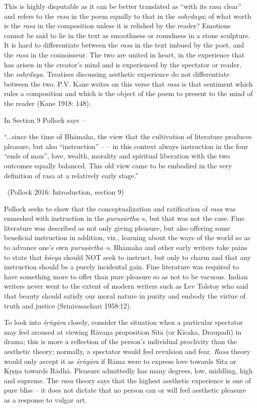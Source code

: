 This is highly disputable as it can be better translated as “with its rasa clear” and refers to the \textit{rasa }in the poem equally to that in the \textit{sahṛdaya}; of what worth is the \textit{rasa} in the composition unless it is relished by the reader? Emotions cannot be said to lie in the text as smoothness or roundness in a stone sculpture. It is hard to differentiate between the \textit{rasa} in the text imbued by the poet, and the \textit{rasa} in the connoisseur. The two are united in heart, in the experience that has arisen in the creator’s mind and is experienced by the spectator or reader, the \textit{sahṛdaya.} Treatises discussing aesthetic experience do not differentiate between the two. P.V. Kane writes on this verse that \textit{rasa} is that sentiment which rules a composition and which is the object of the poem to present to the mind of the reader (Kane 1918: 148).

In Section 9 Pollock says –

\begin{myquote}
“...since the time of Bhāmaha, the view that the cultivation of literature produces pleasure, but also “instruction” – – in this context always instruction in the four “ends of man”, love, wealth, morality and spiritual liberation with the two outcomes equally balanced. This old view came to be embodied in the very definition of rasa at a relatively early stage.” 

~\hfill (Pollock 2016: Introduction, section 9)
\end{myquote}

Pollock seeks to show that the conceptualization and ratification of \textit{rasa} was enmeshed with instruction in the \textit{puruṣārtha–}s, but that was not the case. Fine literature was described as not only giving pleasure, but also offering some beneficial instruction in addition, viz., learning about the ways of the world so as to advance one’s own \textit{puruṣārtha–s}. Bhāmaha and other early writers take pains to state that \textit{kāvya} should NOT seek to instruct, but only to charm and that any instruction should be a purely incidental gain. Fine literature was required to have something more to offer than pure pleasure so as not to be vacuous. Indian writers never went to the extent of modern writers such as Lev Tolstoy who said that beauty should satisfy our moral nature in purity and embody the virtue of truth and justice (Srinivasachari 1958:12).

To look into \textit{śṛṅgāra} closely, consider the situation when a particular spectator may feel aroused at viewing Rāvaṇa proposition Sītā (or Kīcaka, Draupadī) in drama; this is more a reflection of the person’s individual proclivity than the aesthetic theory; normally, a spectator would feel revulsion and fear. \textit{Rasa} theory would only accept it as \textit{śṛṅgāra} if Rāma were to express love towards Sīta or Kṛṣṇa towards Rādhā. Pleasure admittedly has many degrees, low, middling, high and supreme. The \textit{rasa} theory says that the highest aesthetic experience is one of pure bliss – it does not dictate that no person can or will feel aesthetic pleasure as a response to vulgar art.

